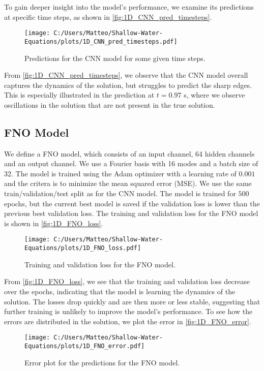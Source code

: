 To gain deeper insight into the model's performance, we examine its predictions at specific time steps, as shown in \autoref{fig:1D_CNN_pred_timesteps}.
\begin{figure}[H]
    \centering
    \texttt{[image: C:/Users/Matteo/Shallow-Water-Equations/plots/1D\_CNN\_pred\_timesteps.pdf]}
    \caption{Predictions for the CNN model for some given time steps.}\label{fig:1D_CNN_pred_timesteps}
\end{figure}
From \autoref{fig:1D_CNN_pred_timesteps}, we observe that the CNN model overall captures the dynamics of the solution, but struggles to predict the sharp edges.
This is especially illustrated in the prediction at $t = 0.97$ s, where we observe oscillations in the solution that are not present in the true solution.

\subsection*{FNO Model}
We define a FNO model, which consists of an input channel, 64 hidden channels and an output channel. We use a Fourier basis with 16 modes and a batch size of 32.
The model is trained using the Adam optimizer with a learning rate of $0.001$ and the critera is to minimize the mean squared error (MSE).
We use the same train/validation/test split as for the CNN model.
The model is trained for $500$ epochs, but the current best model is saved if the validation loss is lower than the previous best validation loss.
The training and validation loss for the FNO model is shown in \autoref{fig:1D_FNO_loss}.
\begin{figure}[H]
    \centering
    \texttt{[image: C:/Users/Matteo/Shallow-Water-Equations/plots/1D\_FNO\_loss.pdf]}
    \caption{Training and validation loss for the FNO model.}\label{fig:1D_FNO_loss}
\end{figure}
From \autoref{fig:1D_FNO_loss}, we see that the training and validation loss decrease over the epochs, indicating that the model is learning the dynamics of the solution.
The losses drop quickly and are then more or less stable, suggesting that further training is unlikely to improve the model's performance.
To see how the errors are distributed in the solution, we plot the error in \autoref{fig:1D_FNO_error}.
\begin{figure}[H]
    \centering
    \texttt{[image: C:/Users/Matteo/Shallow-Water-Equations/plots/1D\_FNO\_error.pdf]}
    \caption{Error plot for the predictions for the FNO model.}\label{fig:1D_FNO_error}
\end{figure}

